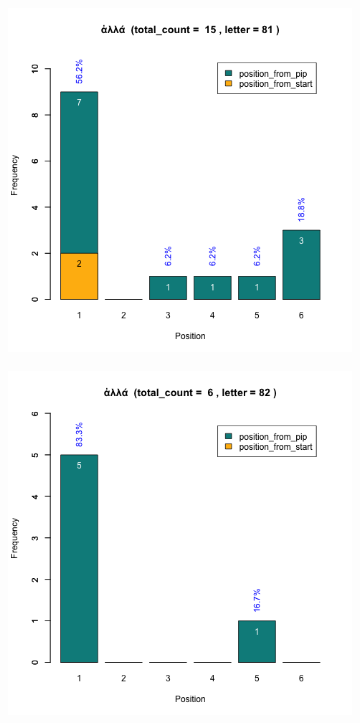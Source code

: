 \documentclass[a4paper]{article}
\begin{document}
\begin{figure}
\begin{subfigure}{0.45\textwidth}
\centering
\includegraphics[width=1\linewidth]{../../data/output/peter_R_par/plots/par6_lt81.png}
\end{subfigure}
\begin{subfigure}{0.45\textwidth}
\centering
\includegraphics[width=1\linewidth]{../../data/output/peter_R_par/plots/par6_lt82.png}
\end{subfigure}
\end{figure}
\end{document}

